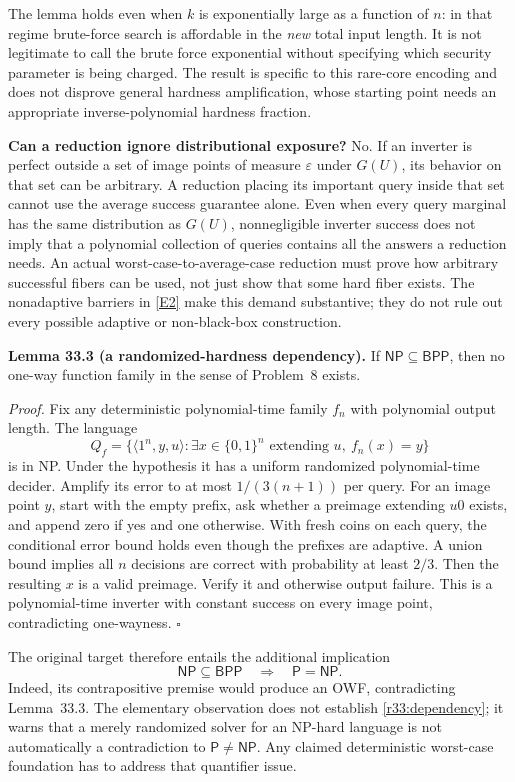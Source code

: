 \documentclass[11pt,a4paper]{article}
\newcommand{\eref}[2]{\hyperlink{extra:#1:#2}{[E#2]}}
\numberwithin{equation}{section}
\begin{document}
The lemma holds even when $k$ is exponentially large as a function of $n$:
in that regime brute-force search is affordable in the \emph{new} total
input length. It is not legitimate to call the brute force exponential
without specifying which security parameter is being charged. The result
is specific to this rare-core encoding and does not disprove general
hardness amplification, whose starting point needs an appropriate
inverse-polynomial hardness fraction.

\medskip
\textbf{Can a reduction ignore distributional exposure?}
No. If an inverter is perfect outside a set of image points of measure
$\varepsilon$ under $G(U)$, its behavior on that set can be arbitrary.
A reduction placing its important query inside that set cannot use the
average success guarantee alone. Even when every query marginal has the
same distribution as $G(U)$, nonnegligible inverter success does not imply
that a polynomial collection of queries contains all the answers a
reduction needs. An actual worst-case-to-average-case reduction must prove
how arbitrary successful fibers can be used, not just show that some hard
fiber exists. The nonadaptive barriers in \eref{33}{2} make this demand
substantive; they do not rule out every possible adaptive or non-black-box
construction.

\medskip
\textbf{Lemma 33.3 (a randomized-hardness dependency).}
If $\mathsf{NP}\subseteq\mathsf{BPP}$, then no one-way function family in
the sense of Problem~8 exists.

\emph{Proof.} Fix any deterministic polynomial-time family $f_n$ with
polynomial output length. The language
\[
 Q_f=\{\langle1^n,y,u\rangle:
       \exists x\in\{0,1\}^n\text{ extending }u,\ f_n(x)=y\}
\]
is in NP. Under the hypothesis it has a uniform randomized polynomial-time
decider. Amplify its error to at most $1/(3(n+1))$ per query. For an image
point $y$, start with the empty prefix, ask whether a preimage extending
$u0$ exists, and append zero if yes and one otherwise. With fresh coins on
each query, the conditional error bound holds even though the prefixes
are adaptive. A union bound implies all $n$ decisions are correct with
probability at least $2/3$. Then the resulting $x$ is a valid preimage.
Verify it and otherwise output failure. This is a polynomial-time inverter
with constant success on every image point, contradicting one-wayness.
\hfill$\square$

The original target therefore entails the additional implication
\begin{equation}\label{r33:dependency}
 \mathsf{NP}\subseteq\mathsf{BPP}\quad\Longrightarrow\quad
                      \mathsf P=\mathsf{NP}.
\end{equation}
Indeed, its contrapositive premise would produce an OWF, contradicting
Lemma~33.3. The elementary observation does not establish
\eqref{r33:dependency}; it warns that a merely randomized solver for an
NP-hard language is not automatically a contradiction to
$\mathsf P\ne\mathsf{NP}$. Any claimed deterministic worst-case foundation
has to address that quantifier issue.
\end{document}
